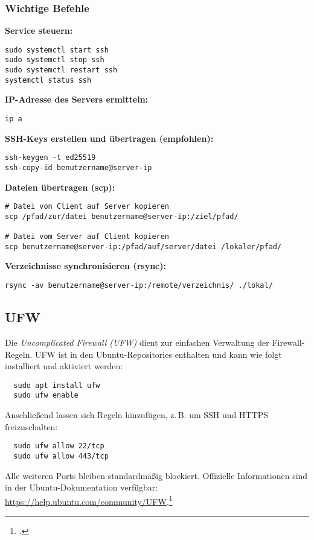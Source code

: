 \documentclass[12pt,a4paper]{report}
\begin{document}
  \subsubsection*{Wichtige Befehle}  

  \textbf{Service steuern:}  
  \begin{verbatim}
sudo systemctl start ssh
sudo systemctl stop ssh
sudo systemctl restart ssh
systemctl status ssh
  \end{verbatim}  

  \textbf{IP-Adresse des Servers ermitteln:}  
  \begin{verbatim}
ip a
  \end{verbatim}  

  \textbf{SSH-Keys erstellen und übertragen (empfohlen):}  
  \begin{verbatim}
ssh-keygen -t ed25519
ssh-copy-id benutzername@server-ip
  \end{verbatim}  

  \textbf{Dateien übertragen (scp):}  
  \begin{verbatim}
# Datei von Client auf Server kopieren
scp /pfad/zur/datei benutzername@server-ip:/ziel/pfad/

# Datei vom Server auf Client kopieren
scp benutzername@server-ip:/pfad/auf/server/datei /lokaler/pfad/
  \end{verbatim}  

  \textbf{Verzeichnisse synchronisieren (rsync):}  
  \begin{verbatim}
rsync -av benutzername@server-ip:/remote/verzeichnis/ ./lokal/
  \end{verbatim}  

  \subsection{UFW}  
  Die \emph{Uncomplicated Firewall (UFW)} dient zur einfachen Verwaltung der Firewall-Regeln.  
  UFW ist in den Ubuntu-Repositories enthalten und kann wie folgt installiert und aktiviert werden:  
  \begin{verbatim}
  sudo apt install ufw
  sudo ufw enable
  \end{verbatim}  
  Anschließend lassen sich Regeln hinzufügen, z.\,B. um SSH und HTTPS freizuschalten:  
  \begin{verbatim}
  sudo ufw allow 22/tcp
  sudo ufw allow 443/tcp
  \end{verbatim}  
  Alle weiteren Ports bleiben standardmäßig blockiert.  
  Offizielle Informationen sind in der Ubuntu-Dokumentation verfügbar: \url{https://help.ubuntu.com/community/UFW}.\footcite[Vgl.][Kapitel~22, S.~932~ff.]{nemeth_unixlinux}
\end{document}
